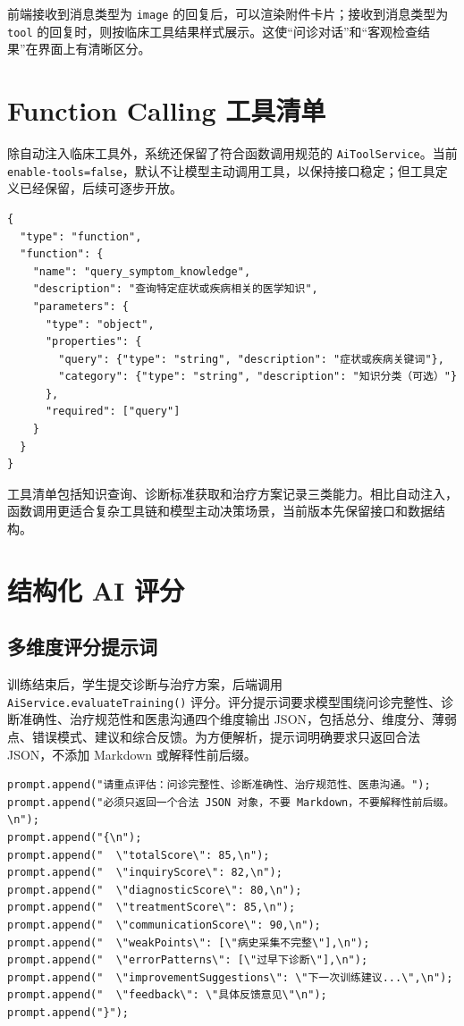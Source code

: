 前端接收到消息类型为 \texttt{image} 的回复后，可以渲染附件卡片；接收到消息类型为 \texttt{tool} 的回复时，则按临床工具结果样式展示。这使“问诊对话”和“客观检查结果”在界面上有清晰区分。

\section{Function Calling 工具清单}

除自动注入临床工具外，系统还保留了符合函数调用规范的 \texttt{AiToolService}。当前 \texttt{enable-tools=false}，默认不让模型主动调用工具，以保持接口稳定；但工具定义已经保留，后续可逐步开放。

\begin{lstlisting}[caption={query\_symptom\_knowledge 工具的 JSON Schema（节选）}, label={lst:tool_schema}]
{
  "type": "function",
  "function": {
    "name": "query_symptom_knowledge",
    "description": "查询特定症状或疾病相关的医学知识",
    "parameters": {
      "type": "object",
      "properties": {
        "query": {"type": "string", "description": "症状或疾病关键词"},
        "category": {"type": "string", "description": "知识分类（可选）"}
      },
      "required": ["query"]
    }
  }
}
\end{lstlisting}

工具清单包括知识查询、诊断标准获取和治疗方案记录三类能力。相比自动注入，函数调用更适合复杂工具链和模型主动决策场景，当前版本先保留接口和数据结构。

\section{结构化 AI 评分}

\subsection{多维度评分提示词}

训练结束后，学生提交诊断与治疗方案，后端调用 \texttt{AiService.evaluateTraining()} 评分。评分提示词要求模型围绕问诊完整性、诊断准确性、治疗规范性和医患沟通四个维度输出 JSON，包括总分、维度分、薄弱点、错误模式、建议和综合反馈。为方便解析，提示词明确要求只返回合法 JSON，不添加 Markdown 或解释性前后缀。

\begin{lstlisting}[style=java, caption={结构化评分提示词字段（节选）}, label={lst:evaluate_prompt}]
prompt.append("请重点评估：问诊完整性、诊断准确性、治疗规范性、医患沟通。");
prompt.append("必须只返回一个合法 JSON 对象，不要 Markdown，不要解释性前后缀。\n");
prompt.append("{\n");
prompt.append("  \"totalScore\": 85,\n");
prompt.append("  \"inquiryScore\": 82,\n");
prompt.append("  \"diagnosticScore\": 80,\n");
prompt.append("  \"treatmentScore\": 85,\n");
prompt.append("  \"communicationScore\": 90,\n");
prompt.append("  \"weakPoints\": [\"病史采集不完整\"],\n");
prompt.append("  \"errorPatterns\": [\"过早下诊断\"],\n");
prompt.append("  \"improvementSuggestions\": \"下一次训练建议...\",\n");
prompt.append("  \"feedback\": \"具体反馈意见\"\n");
prompt.append("}");
\end{lstlisting}

